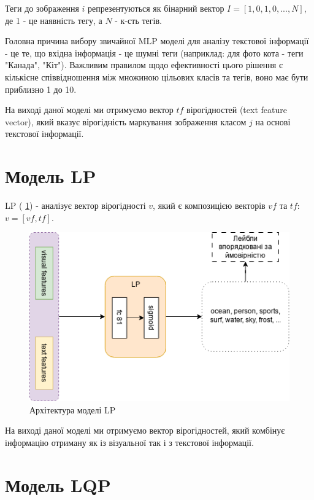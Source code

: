 \documentclass{udstu}
\begin{document}
Теги до зображення $i$ репрезентуються як бінарний вектор $I = [1,0,1,0, ..., N]$,
де 1 - це наявність тегу, а $N$ - к-сть тегів.

Головна причина вибору звичайної MLP моделі для аналізу текстової інформації - це
те, що вхідна інформація - це шумні теги (наприклад: для фото кота - теги "Канада", "Кіт").
Важливим правилом щодо ефективності цього рішення є кількісне співвідношення між множиною
цільових класів та тегів, воно має бути приблизно 1 до 10.

На виході даної моделі ми отримуємо вектор $tf$ вірогідностей (text feature vector),
який вказує вірогідність маркування зображення класом $j$ на основі текстової інформації.


\section{Модель LP}

LP (\figurename{ \ref{figure:lp}}) - аналізує вектор вірогідності $v$,
який є композицією векторів $vf$ та $tf$: $v = [vf, tf]$.

\begin{figure}[!ht]
	\centering
	\includegraphics[width=1.0\textwidth]{PNG/lp}
	\caption{Архітектура моделі LP}
	\label{figure:lp}
\end{figure}

На виході даної моделі ми отримуємо вектор вірогідностей, який комбінує інформацію отриману як із візуальної так і з
текстової інформації.


\section{Модель LQP}
\end{document}
